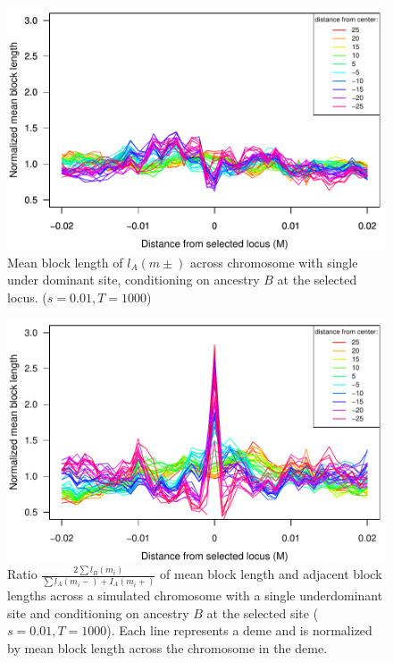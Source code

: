 \begin{figure}
\includegraphics{figs/adjacentBlocksAlongChromAncBConditioning.pdf}
\caption{Mean block length of $l_A(m\pm)$ across chromosome with single under dominant site, conditioning on ancestry $B$ at the selected locus. ($s=0.01, T=1000$)}\label{Supp:adjacentBlocks}
\end{figure}


\begin{figure}
\includegraphics{figs/ratioAdjacentBlocksAlongChromAncBConditioning.pdf}
\caption{Ratio $\frac{2\sum{l_B(m_i)}}{\sum{l_A(m_i-)+I_A(m_i+)}}$ of mean block length and adjacent block lengths across a simulated chromosome with a single underdominant site and conditioning on ancestry $B$ at the selected site ($s=0.01, T=1000$).  Each line represents a deme and is normalized by mean block length across the chromosome in the deme.}\label{Supp:ratioBlockAdjacent}
\end{figure}


